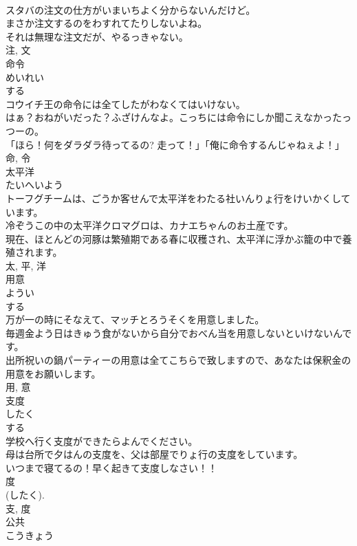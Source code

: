 \documentclass[8pt]{extreport}
\begin{document}
\begin{CJK}{UTF8}{min}
\\	スタバの注文の仕方がいまいちよく分からないんだけど。	
\\	まさか注文するのをわすれてたりしないよね。	
\\	それは無理な注文だが、やるっきゃない。	
\\	注, 文	
\\	命令	
\\	めいれい	
\\	する 
\\	コウイチ王の命令には全てしたがわなくてはいけない。	
\\	はぁ？おねがいだった？ふざけんなよ。こっちには命令にしか聞こえなかったっつーの。	
\\	「ほら！何をダラダラ待ってるの? 走って！」「俺に命令するんじゃねぇよ！」	
\\	命, 令	
\\	太平洋	
\\	たいへいよう	
\\	トーフグチームは、ごうか客せんで太平洋をわたる社いんりょ行をけいかくしています。	
\\	冷ぞうこの中の太平洋クロマグロは、カナエちゃんのお土産です。	
\\	現在、ほとんどの河豚は繁殖期である春に収穫され、太平洋に浮かぶ籠の中で養殖されます。	
\\	太, 平, 洋	
\\	用意	
\\	ようい	
\\	する 
\\	万が一の時にそなえて、マッチとろうそくを用意しました。	
\\	毎週金よう日はきゅう食がないから自分でおべん当を用意しないといけないんです。	
\\	出所祝いの鍋パーティーの用意は全てこちらで致しますので、あなたは保釈金の用意をお願いします。	
\\	用, 意	
\\	支度	
\\	したく	
\\	する 
\\	学校へ行く支度ができたらよんでください。	
\\	母は台所で夕はんの支度を、父は部屋でりょ行の支度をしています。	
\\	いつまで寝てるの！早く起きて支度しなさい！！	
\\	度 
\\	(したく). 
\\	支, 度	
\\	公共	
\\	こうきょう	

\end{CJK}
\end{document}
